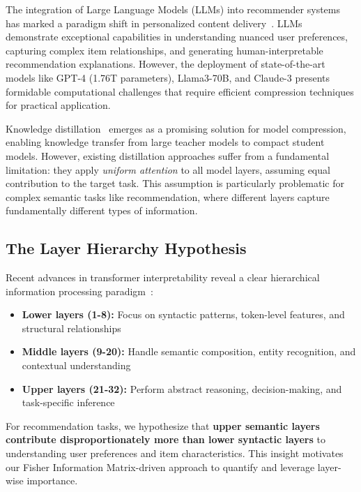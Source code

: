 \documentclass[10pt,conference]{IEEEtran}
\begin{document}
The integration of Large Language Models (LLMs) into recommender systems has marked a paradigm shift in personalized content delivery~\cite{zhao2023llm4rec,li2023llm4rec}. LLMs demonstrate exceptional capabilities in understanding nuanced user preferences, capturing complex item relationships, and generating human-interpretable recommendation explanations. However, the deployment of state-of-the-art models like GPT-4 (1.76T parameters), Llama3-70B, and Claude-3 presents formidable computational challenges that require efficient compression techniques for practical application.

Knowledge distillation~\cite{hinton2015distilling} emerges as a promising solution for model compression, enabling knowledge transfer from large teacher models to compact student models. However, existing distillation approaches suffer from a fundamental limitation: they apply \textit{uniform attention} to all model layers, assuming equal contribution to the target task. This assumption is particularly problematic for complex semantic tasks like recommendation, where different layers capture fundamentally different types of information.

\subsection{The Layer Hierarchy Hypothesis}

Recent advances in transformer interpretability reveal a clear hierarchical information processing paradigm~\cite{rogers2020primer,tenney2019bert}: 
\begin{itemize}[leftmargin=*]
    \item \textbf{Lower layers (1-8):} Focus on syntactic patterns, token-level features, and structural relationships
    \item \textbf{Middle layers (9-20):} Handle semantic composition, entity recognition, and contextual understanding  
    \item \textbf{Upper layers (21-32):} Perform abstract reasoning, decision-making, and task-specific inference
\end{itemize}

For recommendation tasks, we hypothesize that \textbf{upper semantic layers contribute disproportionately more than lower syntactic layers} to understanding user preferences and item characteristics. This insight motivates our Fisher Information Matrix-driven approach to quantify and leverage layer-wise importance.
\end{document}
